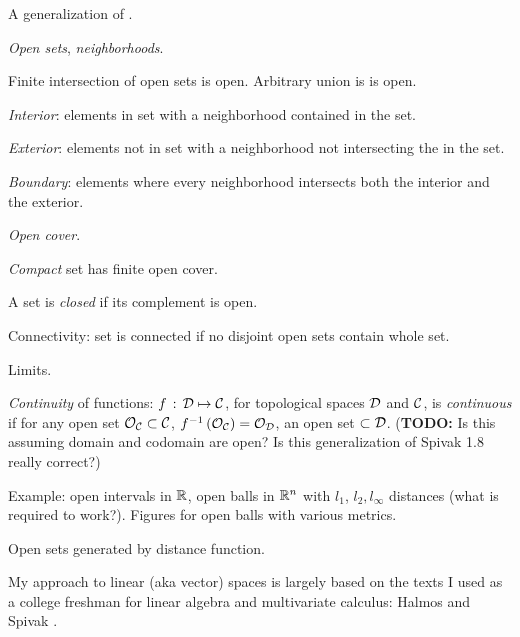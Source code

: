 \label{sec:Topological-spaces}

A generalization of
\cite[][chapter 1]{spivak-1965}.

\textit{Open sets}, \textit{neighborhoods}.

Finite intersection of open sets is open.
Arbitrary union is is open. 

\textit{Interior}: elements in set 
with a neighborhood contained
in the set.

\textit{Exterior}: elements not in set
with a neighborhood not intersecting the
in the set.

\textit{Boundary}: elements where every neighborhood
intersects both the interior and the exterior.

\textit{Open cover}. 

\textit{Compact} set has finite open cover.

A set is \textit{closed} if its complement is open.

Connectivity: set is connected if no disjoint open sets contain
whole set.

Limits.

\textit{Continuity} of functions: \cite[See][Theorem 1.8]{spivak-1965}
$f \, : \, \mathcal{D} \mapsto \mathcal{C}$,
for topological spaces $\mathcal{D}$ and $\mathcal{C}$,
is \textit{continuous}
if for any open set $\mathcal{O}_{\mathcal{C}} \subset \mathcal{C}$,
$f^{-1}\left( \mathcal{O}_{\mathcal{C}} \right) = 
\mathcal{O}_{\mathcal{D}}$, an open set $\subset \mathcal{D}$.
(\textbf{TODO:} Is this assuming domain and codomain are open?
Is this generalization of Spivak 1.8 really correct?)

Example: open intervals in $\mathbb{R}$,
open balls in $\mathbb{R}^n$ with $l_1$, $l_2, l_{\infty}$ distances
(what is required to work?).
Figures for open balls with various metrics.

\label{sec:Metric-spaces}

Open sets generated by distance function.

\label{sec:Linear-spaces}

My approach to linear (aka vector) spaces is largely based on
the texts I used as a college freshman for linear algebra and
multivariate calculus: Halmos \cite{halmos-1958}
and Spivak \cite{spivak-1965}.

